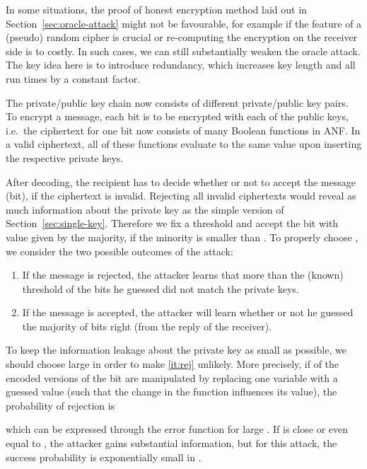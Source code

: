 \documentclass[final,journal,compsoc]{IEEEtran}
\begin{document}
In some situations, the proof of honest encryption method laid out in
Section~\ref{sec:oracle-attack} might not be favourable, for example if the
feature of a (pseudo) random cipher is crucial or re-computing the
encryption on the receiver side is to costly. In such cases, we can
still substantially weaken the oracle attack.  The key idea here is to
introduce redundancy, which increases key length and all run times by
a constant factor. 


The private/public key chain now consists of
 different private/public key pairs. To encrypt a message,
each bit is to be encrypted with each of the public keys, i.e.\
the ciphertext for one bit now consists of  many Boolean functions
in ANF. In a valid ciphertext, all of these functions evaluate to the same
value upon inserting the respective private keys.


After decoding, the recipient has to decide whether or not to accept
the message (bit), if the ciphertext is invalid. Rejecting all invalid
ciphertexts would reveal as much information about the private key as the
simple version of Section~\ref{sec:single-key}. Therefore we fix a
threshold  and accept the bit with value
given by the majority, if the minority is smaller than . To
properly choose , we consider the two possible outcomes of the
attack:
\begin{enumerate}
\item If the message is rejected, the attacker learns that more than
  the (known) threshold  of the bits he guessed did not match the
  private keys. \label{it:rej}

\item If the message is accepted, the attacker will learn whether or
  not he guessed the majority of bits right (from the reply of the
  receiver).

\end{enumerate}

To keep the information leakage about the private key as small as
possible, we should choose  large in order to make \eqref{it:rej}
unlikely. More precisely, if  of the
encoded versions of the bit are manipulated by replacing one variable with a
guessed value (such that the change in the function influences
its value), the probability of rejection is

which can be expressed through the error function for large .
If  is close or even equal to , the attacker gains substantial
information, but for this attack, the success probability is
exponentially small in . 
\end{document}
